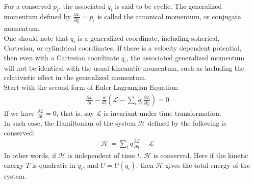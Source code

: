 \documentclass[11pt,oneside]{book}
\theoremstyle{break}
\theoremstyle{break}
\begin{document}
For a conserved $p_i$, the associated $q_i$ is said to be cyclic. The generalized momentum defined by $\frac{\partial \mathcal{L}}{\partial \dot{q}_i} = p_i$ is called the canonical momentum, or conjugate momentum. \\

One should note that $q_i$ is a generalized coordinate, including spherical, Cartesian, or cylindrical coordinates. If there is a velocity dependent potential, then even with a Cartesian coordinate $q_i$, the associated generalized momentum will not be identical with the usual kinematic momentum, such as including the relativistic effect in the generalized momentum. \\

Start with the second form of Euler-Lagrangian Equation:
\begin{align*}
\frac{\partial \mathcal{L}}{\partial t} - \frac{d}{dt}\left( \mathcal{L} - \sum_{i}\dot{q}_i \frac{\partial \mathcal{L}}{\partial \dot{q}_i}\right) = 0
\end{align*}
If we have $\frac{\partial \mathcal{L}}{\partial t} = 0$, that is, say $\mathcal{L}$ is invariant under time transformation. \\In such case, the Hamiltonian of the system $\mathcal{H}$ defined by the following is conserved:
\begin{align*}
\mathcal{H} \coloneqq \sum_{i}\dot{q}\frac{\partial \mathcal{L}}{\partial \dot{q}} -\mathcal{L}
\end{align*}
In other words, if $\mathcal{H}$ is independent of time $t$, $\mathcal{H}$ is conserved. Here if the kinetic energy $T$ is quadratic in $\dot{q}_i$, and $U = U(q_i)$, then $\mathcal{H}$ gives the total energy of the system. \\
\end{document}
